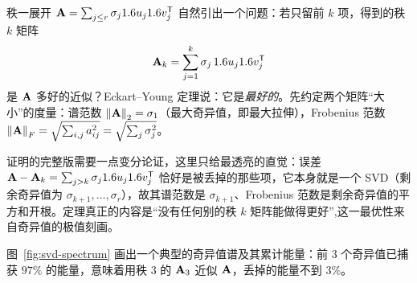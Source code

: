 秩一展开 $\mat A=\sum_{j\le r}\sigma_j\vc u_j\vc v_j\T$ 自然引出一个问题：若只留前 $k$ 项，得到的秩 $k$ 矩阵
\[
    \mat A_k=\sum_{j=1}^{k}\sigma_j\,\vc u_j\vc v_j\T
\]
是 $\mat A$ 多好的近似？Eckart–Young 定理说：它是\emph{最好的}。先约定两个矩阵``大小''的度量：谱范数 $\norm[2]{\mat A}=\sigma_1$（最大奇异值，即最大拉伸），Frobenius 范数 $\norm[F]{\mat A}=\sqrt{\sum_{i,j}a_{ij}^2}=\sqrt{\sum_j\sigma_j^2}$。


证明的完整版需要一点变分论证，这里只给最透亮的直觉：误差 $\mat A-\mat A_k=\sum_{j>k}\sigma_j\vc u_j\vc v_j\T$ 恰好是被丢掉的那些项，它本身就是一个 SVD（剩余奇异值为 $\sigma_{k+1},\dots,\sigma_r$），故其谱范数是 $\sigma_{k+1}$、Frobenius 范数是剩余奇异值的平方和开根。定理真正的内容是``没有任何别的秩 $k$ 矩阵能做得更好'',这一最优性来自奇异值的极值刻画。


图~\ref{fig:svd-spectrum} 画出一个典型的奇异值谱及其累计能量：前 $3$ 个奇异值已捕获 $97\%$ 的能量，意味着用秩 $3$ 的 $\mat A_3$ 近似 $\mat A$，丢掉的能量不到 $3\%$。


